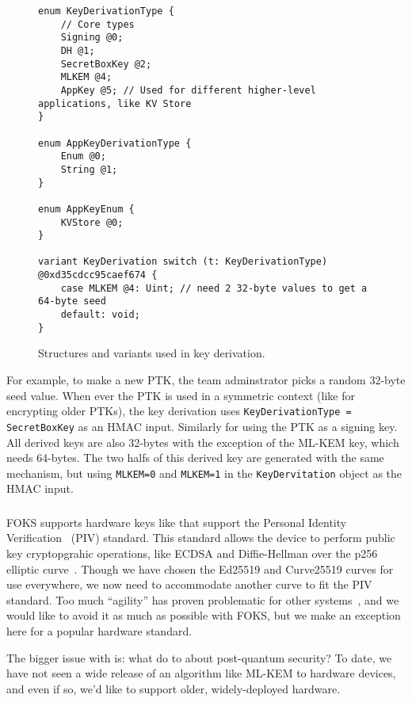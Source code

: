 \begin{figure}[ht]
  \centering
  \begin{verbatim}
enum KeyDerivationType {
    // Core types
    Signing @0;
    DH @1;
    SecretBoxKey @2;
    MLKEM @4;
    AppKey @5; // Used for different higher-level applications, like KV Store
}

enum AppKeyDerivationType {
    Enum @0;
    String @1;
}

enum AppKeyEnum {
    KVStore @0;
}

variant KeyDerivation switch (t: KeyDerivationType) @0xd35cdcc95caef674 {
    case MLKEM @4: Uint; // need 2 32-byte values to get a 64-byte seed
    default: void;
}
\end{verbatim}
  \caption{Structures and variants used in key derivation.}
  \label{fig:key-derivation}
\end{figure}

For example, to make a new PTK, the team adminstrator picks a random 32-byte
seed value.  When ever the PTK is used in a symmetric context (like for
encrypting older PTKs), the key derivation uses \texttt{KeyDerivationType =
SecretBoxKey} as an HMAC input.  Similarly for using the PTK as a signing key.
All derived keys are also 32-bytes with the exception of the ML-KEM key, which
needs 64-bytes. The two halfs of this derived key are generated with the same
mechanism, but using \texttt{MLKEM=0} and \texttt{MLKEM=1} in the
\texttt{KeyDervitation} object as the HMAC input.

\subsubsection{\Yubis}

FOKS supports hardware keys like \yubi{} that support the Personal Identity
Verification~\cite{nist-sp-800-73-5} (PIV) standard.  This standard allows the
device to perform public key cryptopgrahic operations, like ECDSA and
Diffie-Hellman over the p256 elliptic curve~\cite{nist-fips-186-3}. Though we
have chosen the Ed25519 and Curve25519 curves for use everywhere, we now need to
accommodate another curve to fit the PIV standard. Too much ``agility'' has
proven problematic for other systems~\cite{jwt-none}, and we would like to avoid
it as much as possible with FOKS, but we make an exception here for a popular
hardware standard.

The bigger issue with \yubis{} is: what do to about post-quantum security?  To
date, we have not seen a wide release of an algorithm like ML-KEM to hardware
devices, and even if so, we'd like to support older, widely-deployed hardware. 

